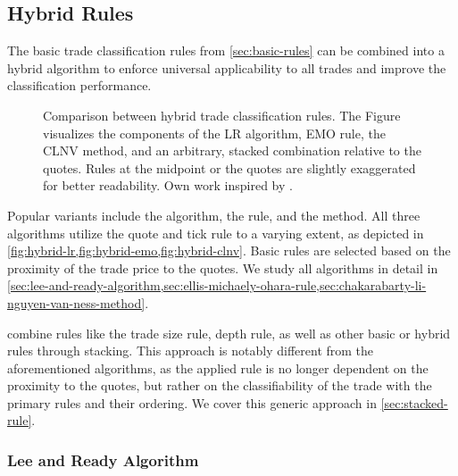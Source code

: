 \subsection{Hybrid Rules}\label{sec:hybrid-rules}

The basic trade classification rules from \cref{sec:basic-rules} can be combined into a hybrid algorithm to enforce universal applicability to all trades and improve the classification performance.


\begin{figure}[ht!]
  \hfill%
  \hfill%
  \hfill%
  \caption[Comparison Between Hybrid Trade Classification Rules]{Comparison between hybrid trade classification rules. The Figure visualizes the components of the \acrshort{LR} algorithm, \acrshort{EMO} rule, the \acrshort{CLNV} method, and an arbitrary, stacked combination relative to the quotes. Rules at the midpoint or the quotes are slightly exaggerated for better readability. Own work inspired by \textcite[][167]{poppeSensitivityVPINChoice2016}.}
  \label{fig:hybrid-algorithms}
\end{figure}

Popular variants include the  algorithm, the  rule, and the  method. All three algorithms utilize the quote and tick rule to a varying extent, as depicted in \cref{fig:hybrid-lr,fig:hybrid-emo,fig:hybrid-clnv}. Basic rules are selected based on the proximity of the trade price to the quotes. We study all algorithms in detail in \cref{sec:lee-and-ready-algorithm,sec:ellis-michaely-ohara-rule,sec:chakarabarty-li-nguyen-van-ness-method}.

\textcite[][18]{grauerOptionTradeClassification2022} combine rules like the trade size rule, depth rule, as well as other basic or hybrid rules through stacking. This approach is notably different from the aforementioned algorithms, as the applied rule is no longer dependent on the proximity to the quotes, but rather on the classifiability of the trade with the primary rules and their ordering. We cover this generic approach in \cref{sec:stacked-rule}.
\subsubsection{Lee and Ready Algorithm}\label{sec:lee-and-ready-algorithm}

